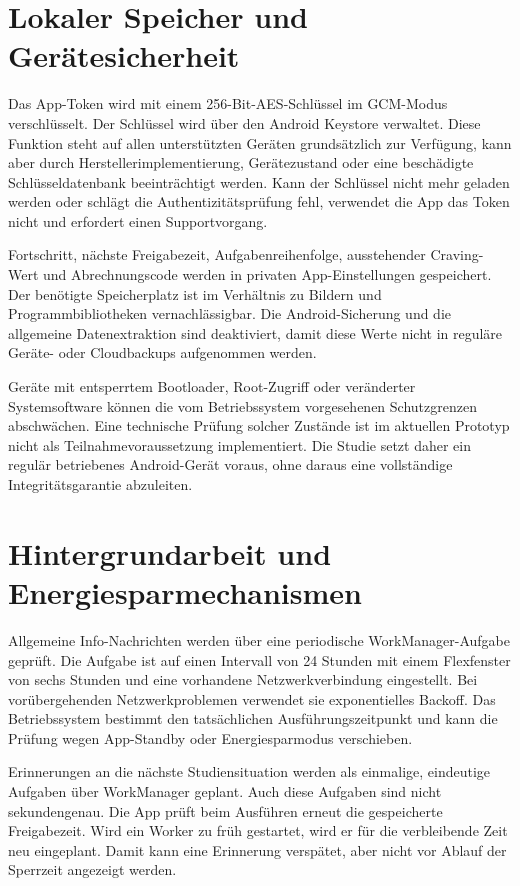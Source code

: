 \section{Lokaler Speicher und Gerätesicherheit}
Das App-Token wird mit einem 256-Bit-AES-Schlüssel im GCM-Modus verschlüsselt. Der Schlüssel wird über den Android Keystore verwaltet. Diese Funktion steht auf allen unterstützten Geräten grundsätzlich zur Verfügung, kann aber durch Herstellerimplementierung, Gerätezustand oder eine beschädigte Schlüsseldatenbank beeinträchtigt werden. Kann der Schlüssel nicht mehr geladen werden oder schlägt die Authentizitätsprüfung fehl, verwendet die App das Token nicht und erfordert einen Supportvorgang.

Fortschritt, nächste Freigabezeit, Aufgabenreihenfolge, ausstehender Craving-Wert und Abrechnungscode werden in privaten App-Einstellungen gespeichert. Der benötigte Speicherplatz ist im Verhältnis zu Bildern und Programmbibliotheken vernachlässigbar. Die Android-Sicherung und die allgemeine Datenextraktion sind deaktiviert, damit diese Werte nicht in reguläre Geräte- oder Cloudbackups aufgenommen werden.

Geräte mit entsperrtem Bootloader, Root-Zugriff oder veränderter Systemsoftware können die vom Betriebssystem vorgesehenen Schutzgrenzen abschwächen. Eine technische Prüfung solcher Zustände ist im aktuellen Prototyp nicht als Teilnahmevoraussetzung implementiert. Die Studie setzt daher ein regulär betriebenes Android-Gerät voraus, ohne daraus eine vollständige Integritätsgarantie abzuleiten.

\section{Hintergrundarbeit und Energiesparmechanismen}

Allgemeine Info-Nachrichten werden über eine periodische WorkManager-Aufgabe geprüft. Die Aufgabe ist auf einen Intervall von 24 Stunden mit einem Flexfenster von sechs Stunden und eine vorhandene Netzwerkverbindung eingestellt. Bei vorübergehenden Netzwerkproblemen verwendet sie exponentielles Backoff. Das Betriebssystem bestimmt den tatsächlichen Ausführungszeitpunkt und kann die Prüfung wegen App-Standby oder Energiesparmodus verschieben.

Erinnerungen an die nächste Studiensituation werden als einmalige, eindeutige Aufgaben über WorkManager geplant. Auch diese Aufgaben sind nicht sekundengenau. Die App prüft beim Ausführen erneut die gespeicherte Freigabezeit. Wird ein Worker zu früh gestartet, wird er für die verbleibende Zeit neu eingeplant. Damit kann eine Erinnerung verspätet, aber nicht vor Ablauf der Sperrzeit angezeigt werden.


